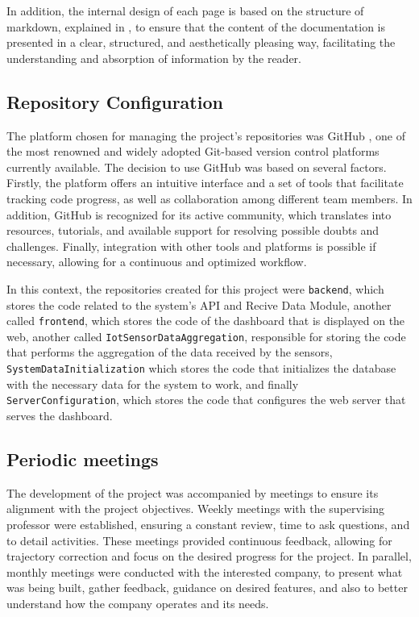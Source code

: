 In addition, the internal design of each page is based on the structure of markdown, explained in \cite{markdownguide}, to ensure that the content of the documentation is presented in a clear, structured, and aesthetically pleasing way, facilitating the understanding and absorption of information by the reader.

\subsection{Repository Configuration}
The platform chosen for managing the project's repositories was GitHub \cite{github}, one of the most renowned and widely adopted Git-based version control platforms currently available. The decision to use GitHub was based on several factors. Firstly, the platform offers an intuitive interface and a set of tools that facilitate tracking code progress, as well as collaboration among different team members. In addition, GitHub is recognized for its active community, which translates into resources, tutorials, and available support for resolving possible doubts and challenges. Finally, integration with other tools and platforms is possible if necessary, allowing for a continuous and optimized workflow. 

In this context, the repositories created for this project were \texttt{backend}, which stores the code related to the system's \gls{API} and Recive Data Module, another called \texttt{frontend}, which stores the code of the dashboard that is displayed on the web, another called \texttt{IotSensorDataAggregation}, responsible for storing the code that performs the aggregation of the data received by the sensors, \texttt{SystemDataInitialization} which stores the code that initializes the database with the necessary data for the system to work, and finally \texttt{ServerConfiguration}, which stores the code that configures the web server that serves the dashboard. 

\subsection{Periodic meetings}
The development of the project was accompanied by meetings to ensure its alignment with the project objectives. Weekly meetings with the supervising professor were established, ensuring a constant review, time to ask questions, and to detail activities. These meetings provided continuous feedback, allowing for trajectory correction and focus on the desired progress for the project. In parallel, monthly meetings were conducted with the interested company, to present what was being built, gather feedback, guidance on desired features, and also to better understand how the company operates and its needs.

